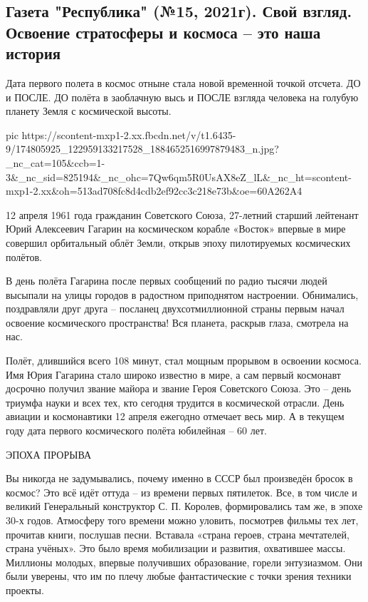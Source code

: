  
 
 
 
 

\subsection{Газета "Республика" (№15, 2021г).  Свой взгляд. Освоение стратосферы и космоса – это наша история}

Дата первого полета в космос отныне стала новой временной точкой отсчета. ДО и
ПОСЛЕ. ДО полёта в заоблачную высь и ПОСЛЕ взгляда человека на голубую планету
Земля с космической высоты.

\ifcmt
  pic https://scontent-mxp1-2.xx.fbcdn.net/v/t1.6435-9/174805925_122959133217528_1884652516997879483_n.jpg?_nc_cat=105&ccb=1-3&_nc_sid=825194&_nc_ohc=7Qw6qm5R0UsAX8eZ_lL&_nc_ht=scontent-mxp1-2.xx&oh=513ad708fc8d4cdb2ef92cc3c218e73b&oe=60A262A4
\fi

12 апреля 1961 года гражданин Советского Союза, 27-летний старший лейтенант
Юрий Алексеевич Гагарин на космическом корабле «Восток» впервые в мире совершил
орбитальный облёт Земли, открыв эпоху пилотируемых космических полётов. 

В день полёта Гагарина после первых сообщений по радио тысячи людей высыпали на
улицы городов в радостном приподнятом настроении. Обнимались, поздравляли друг
друга – посланец двухсотмиллионной страны первым начал освоение космического
пространства! Вся планета, раскрыв глаза, смотрела на нас.

Полёт, длившийся всего 108 минут, стал мощным прорывом в освоении космоса. Имя
Юрия Гагарина стало широко известно в мире, а сам первый космонавт досрочно
получил звание майора и звание Героя Советского Союза. Это – день триумфа науки
и всех тех, кто сегодня трудится в космической отрасли. День авиации и
космонавтики 12 апреля ежегодно отмечает весь мир. А в текущем году дата
первого космического полёта юбилейная – 60 лет.

ЭПОХА ПРОРЫВА

Вы никогда не задумывались, почему именно в СССР был произведён бросок в
космос? Это всё идёт оттуда – из времени первых пятилеток. Все, в том числе и
великий Генеральный конструктор С. П. Королев, формировались там же, в эпохе
30-х годов. Атмосферу того времени можно уловить, посмотрев фильмы тех лет,
прочитав книги, послушав песни. Вставала «страна героев, страна мечтателей,
страна учёных». Это было время мобилизации и развития, охватившее массы.
Миллионы молодых, впервые получивших образование, горели энтузиазмом. Они были
уверены, что им по плечу любые фантастические с точки зрения техники проекты.


